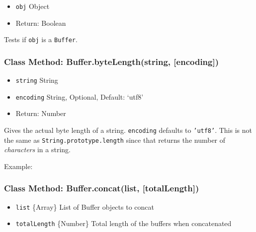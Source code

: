 \begin{itemize}
\item
  \texttt{obj} Object
\item
  Return: Boolean
\end{itemize}

Tests if \texttt{obj} is a \texttt{Buffer}.

\subsubsection{Class Method: Buffer.byteLength(string, {[}encoding{]})}

\begin{itemize}
\item
  \texttt{string} String
\item
  \texttt{encoding} String, Optional, Default: `utf8'
\item
  Return: Number
\end{itemize}

Gives the actual byte length of a string. \texttt{encoding} defaults to
\texttt{'utf8'}. This is not the same as
\texttt{String.prototype.length} since that returns the number of
\emph{characters} in a string.

Example:

\begin{Shaded}
\begin{Highlighting}[]
\NormalTok{;}

 \NormalTok{+ } \NormalTok{+ } \NormalTok{+}
  \NormalTok{) + }\NormalTok{);}

\end{Highlighting}
\end{Shaded}

\subsubsection{Class Method: Buffer.concat(list, {[}totalLength{]})}

\begin{itemize}
\item
  \texttt{list} \{Array\} List of Buffer objects to concat
\item
  \texttt{totalLength} \{Number\} Total length of the buffers when
  concatenated
\end{itemize}

